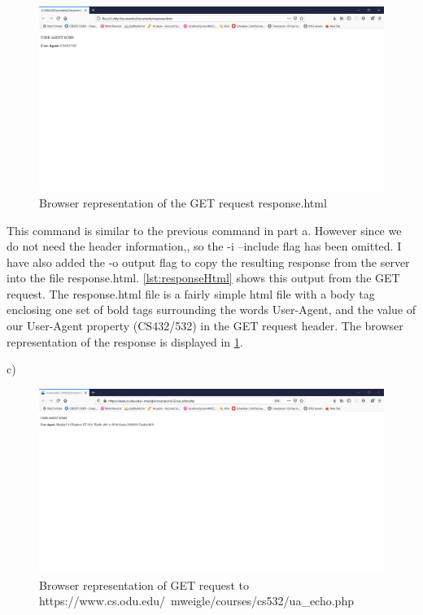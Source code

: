 \documentclass[12pt]{article}
\begin{document}

\begin{figure}[h]
    \centering
    \includegraphics[trim=0 400 300 50, clip, width=\textwidth] {Q2/Q2b_Screenshot.png}
    \caption{Browser representation of the GET request response.html}
    \label{fig:q2BResponse}
\end{figure}

This command is similar to the previous command in part a. However since we do not need the header information,, so the -i --include flag has been omitted. I have also added the -o output flag to copy the resulting
response from the server into the file response.html. \ref{lst:responseHtml} shows this output from the GET request. The response.html file is a fairly simple html file with a body tag enclosing one set of bold tags surrounding the words User-Agent, and  the value of our User-Agent property (CS432/532) in the GET request header. The browser representation of the response is displayed in \ref{fig:q2BResponse}.


c)
\begin{figure}[h]
    \centering
    \includegraphics[trim=0 400 300 50, clip, width=\textwidth] {Q2/Q2c_Screenshot.png}
    \caption{Browser representation of GET request to https://www.cs.odu.edu/~mweigle/courses/cs532/ua\_echo.php }
    \label{fig:q2CResponse}
\end{figure}
\end{document}
